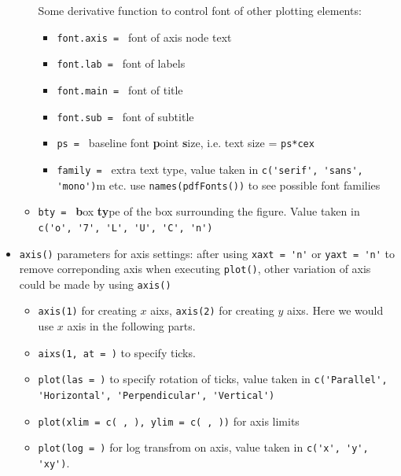 \begin{itemize}[topsep=2pt,itemsep=0pt]
\begin{itemize}[topsep=2pt,itemsep=0pt]
        Some derivative function to control font of other plotting elements:
        \begin{itemize}[topsep=2pt,itemsep=0pt]
            \item \lstinline|font.axis = | font of axis node text
            \item \lstinline|font.lab = | font of labels
            \item \lstinline|font.main = | font of title 
            \item \lstinline|font.sub = | font of subtitle 
            \item \lstinline|ps = | baseline font \textbf{p}oint \textbf{s}ize, i.e. text size = \lstinline|ps*cex|
            \item \lstinline|family = | extra text type, value taken in \lstinline|c('serif', 'sans', 'mono')|m etc. use \lstinline|names(pdfFonts())| to see possible font families
        \end{itemize}
        \item \lstinline|bty = | \textbf{b}ox \textbf{ty}pe of the box surrounding the figure. Value taken in \lstinline|c('o', '7', 'L', 'U', 'C', 'n')| 
    \end{itemize}
    \item \lstinline|axis()| parameters for axis settings: after using \lstinline|xaxt = 'n'| or \lstinline|yaxt = 'n'| to remove correponding axis when executing \lstinline|plot()|, other variation of axis could be made by using \lstinline|axis()|
    \begin{itemize}[topsep=2pt,itemsep=0pt]
        \item \lstinline|axis(1)| for creating $ x $ aixs, \lstinline|axis(2)| for creating $ y $ aixs. Here we would use $ x $ axis in the following parts.
        \item \lstinline|aixs(1, at = )| to specify ticks.
        \item \lstinline|plot(las = )| to specify rotation of ticks, value taken in \lstinline|c('Parallel', 'Horizontal', 'Perpendicular', 'Vertical')|
        \item \lstinline|plot(xlim = c( , ), ylim = c( , ))| for axis limits
        \item \lstinline|plot(log = )| for log transfrom on axis, value taken in \lstinline|c('x', 'y', 'xy')|. 
    \end{itemize}
    
        


\end{itemize}
